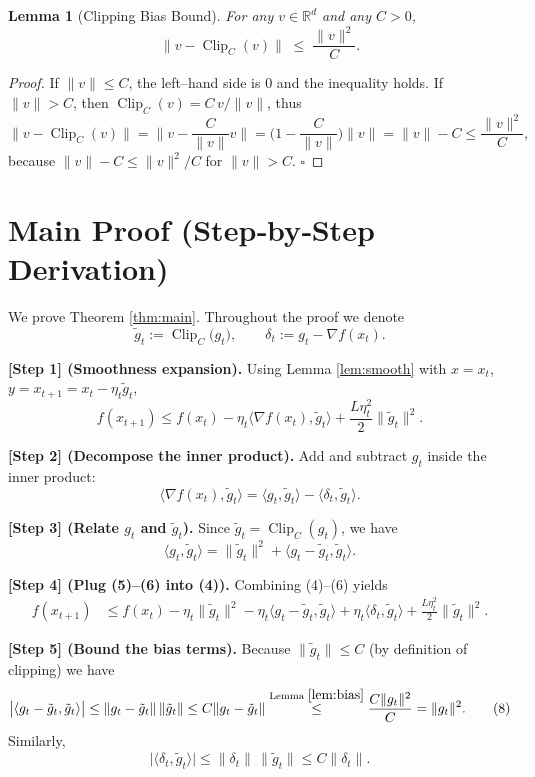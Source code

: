 \documentclass{article}
\newtheorem{lemma}{Lemma}
\newcommand{\R}{\mathbb{R}}
\begin{document}
\begin{lemma}[Clipping Bias Bound]\label{lem:bias}
For any $v\in\R^{d}$ and any $C>0$,
\[
\big\|v-\operatorname{Clip}_{C}(v)\big\|
\;\le\;
\frac{\|v\|^{2}}{C}.
\tag{L2}
\]
\end{lemma}
\begin{proof}
If $\|v\|\le C$, the left–hand side is $0$ and the inequality holds.
If $\|v\|>C$, then $\operatorname{Clip}_{C}(v)=C\,v/\|v\|$, thus
\[
\|v-\operatorname{Clip}_{C}(v)\|
=\Big\|v-\frac{C}{\|v\|}v\Big\|
= \Big(1-\frac{C}{\|v\|}\Big)\|v\|
= \|v\|-C
\le \frac{\|v\|^{2}}{C},
\]
because $\|v\|-C\le \|v\|^{2}/C$ for $\|v\|>C$. \hfill $\square$
\end{proof}

\section*{Main Proof (Step‑by‑Step Derivation)}
We prove Theorem \ref{thm:main}. Throughout the proof we denote
\[
\tilde g_{t}:=\operatorname{Clip}_{C}\!\big(g_{t}\big),\qquad
\delta_{t}:=g_{t}-\nabla f(x_{t}) .
\]

\noindent\textbf{[Step 1] (Smoothness expansion).}  
Using Lemma \ref{lem:smooth} with $x=x_{t}$, $y=x_{t+1}=x_{t}-\eta_{t}\tilde g_{t}$,
\[
f(x_{t+1})\le f(x_{t})-\eta_{t}\langle\nabla f(x_{t}),\tilde g_{t}\rangle
+\frac{L\eta_{t}^{2}}{2}\|\tilde g_{t}\|^{2}.
\tag{4}
\]

\noindent\textbf{[Step 2] (Decompose the inner product).}  
Add and subtract $g_{t}$ inside the inner product:
\[
\langle\nabla f(x_{t}),\tilde g_{t}\rangle
=
\langle g_{t},\tilde g_{t}\rangle
-
\langle\delta_{t},\tilde g_{t}\rangle .
\tag{5}
\]

\noindent\textbf{[Step 3] (Relate $g_{t}$ and $\tilde g_{t}$).}  
Since $\tilde g_{t}= \operatorname{Clip}_{C}(g_{t})$, we have
\[
\langle g_{t},\tilde g_{t}\rangle
=
\|\tilde g_{t}\|^{2}
+\langle g_{t}-\tilde g_{t},\tilde g_{t}\rangle .
\tag{6}
\]

\noindent\textbf{[Step 4] (Plug (5)–(6) into (4)).}  
Combining (4)–(6) yields
\[
\begin{aligned}
f(x_{t+1})
&\le f(x_{t})
-\eta_{t}\|\tilde g_{t}\|^{2}
-\eta_{t}\langle g_{t}-\tilde g_{t},\tilde g_{t}\rangle
+\eta_{t}\langle\delta_{t},\tilde g_{t}\rangle
+\frac{L\eta_{t}^{2}}{2}\|\tilde g_{t}\|^{2}.
\end{aligned}
\tag{7}
\]

\noindent\textbf{[Step 5] (Bound the bias terms).}  
Because $\|\tilde g_{t}\|\le C$ (by definition of clipping) we have
\[
\big|\langle g_{t}-\tilde g_{t},\tilde g_{t}\rangle\big|
\le \|g_{t}-\tilde g_{t}\|\,\|\tilde g_{t}\|
\le C\|g_{t}-\tilde g_{t}\|
\stackrel{\text{Lemma }\ref{lem:bias}}{\le}
\frac{C\|g_{t}\|^{2}}{C}
= \|g_{t}\|^{2}.
\tag{8}
\]
Similarly,
\[
\big|\langle\delta_{t},\tilde g_{t}\rangle\big|
\le \|\delta_{t}\|\,\|\tilde g_{t}\|
\le C\|\delta_{t}\|.
\tag{9}
\]
\end{document}
